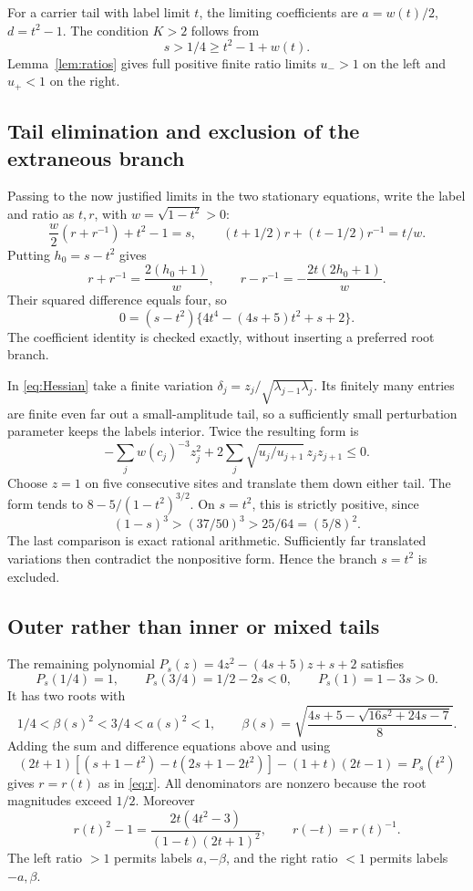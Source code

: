 For a carrier tail with label limit \(t\), the limiting coefficients
are \(a=w(t)/2\), \(d=t^2-1\). The condition \(K>2\) follows from
\[
 s>1/4\ge t^2-1+w(t).
\]
Lemma~\ref{lem:ratios} gives full positive finite ratio limits
\(u_->1\) on the left and \(u_+<1\) on the right.

\subsection{Tail elimination and exclusion of the extraneous branch}
Passing to the now justified limits in the two stationary equations,
write the label and ratio as \(t,r\), with \(w=\sqrt{1-t^2}>0\):
\begin{equation}\label{eq:tailequations}
 \frac w2(r+r^{-1})+t^2-1=s,\qquad
 (t+1/2)r+(t-1/2)r^{-1}=t/w.
\end{equation}
Putting \(h_0=s-t^2\) gives
\[
 r+r^{-1}=\frac{2(h_0+1)}w,\qquad
 r-r^{-1}=-\frac{2t(2h_0+1)}w.
\]
Their squared difference equals four, so
\begin{equation}\label{eq:tailpolynomial}
 0=(s-t^2)\{4t^4-(4s+5)t^2+s+2\}.
\end{equation}
The coefficient identity is checked exactly, without inserting a
preferred root branch.

In \eqref{eq:Hessian} take a finite variation
\(\delta_j=z_j/\sqrt{\lambda_{j-1}\lambda_j}\). Its finitely many
entries are finite even far out a small-amplitude tail, so a sufficiently
small perturbation parameter keeps the labels interior. Twice the
resulting form is
\[
 -\sum_j w(c_j)^{-3}z_j^2
       +2\sum_j\sqrt{u_j/u_{j+1}}\,z_jz_{j+1}\le0.
\]
Choose \(z=1\) on five consecutive sites and translate them down either
tail. The form tends to \(8-5/(1-t^2)^{3/2}\).
On \(s=t^2\), this is strictly positive, since
\[
 (1-s)^3>(37/50)^3>25/64=(5/8)^2.
\]
The last comparison is exact rational arithmetic. Sufficiently far
translated variations then contradict the nonpositive form. Hence
the branch \(s=t^2\) is excluded.

\subsection{Outer rather than inner or mixed tails}
The remaining polynomial \(P_s(z)=4z^2-(4s+5)z+s+2\) satisfies
\[
 P_s(1/4)=1,\qquad P_s(3/4)=1/2-2s<0,\qquad P_s(1)=1-3s>0.
\]
It has two roots with
\[
 1/4<\beta(s)^2<3/4<a(s)^2<1,\qquad
 \beta(s)=\sqrt{\frac{4s+5-\sqrt{16s^2+24s-7}}8}.
\]
Adding the sum and difference equations above and using
\[
 (2t+1)[(s+1-t^2)-t(2s+1-2t^2)]-(1+t)(2t-1)=P_s(t^2)
\]
gives \(r=r(t)\) as in \eqref{eq:r}. All denominators are nonzero
because the root magnitudes exceed \(1/2\). Moreover
\[
 r(t)^2-1=\frac{2t(4t^2-3)}{(1-t)(2t+1)^2},\qquad
 r(-t)=r(t)^{-1}.
\]
The left ratio \(>1\) permits labels \(a,-\beta\), and the right
ratio \(<1\) permits labels \(-a,\beta\).

